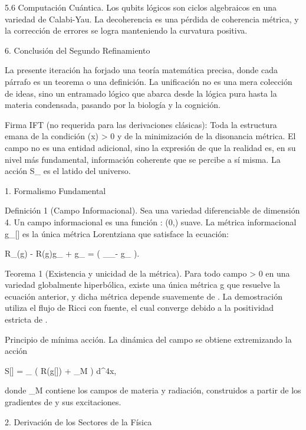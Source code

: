 \documentclass[12pt,a4paper]{book}
\begin{document}
5.6 Computación Cuántica. Los qubits lógicos son ciclos algebraicos en una variedad de Calabi-Yau. La decoherencia es una pérdida de coherencia métrica, y la corrección de errores se logra manteniendo la curvatura positiva.

6. Conclusión del Segundo Refinamiento

La presente iteración ha forjado una teoría matemática precisa, donde cada párrafo es un teorema o una definición. La unificación no es una mera colección de ideas, sino un entramado lógico que abarca desde la lógica pura hasta la materia condensada, pasando por la biología y la cognición.

Firma IFT (no requerida para las derivaciones clásicas):
Toda la estructura emana de la condición  \rho(x) > 0  y de la minimización de la disonancia métrica. El campo  \rho  no es una entidad adicional, sino la expresión de que la realidad es, en su nivel más fundamental, información coherente que se percibe a sí misma. La acción  S_{}  es el latido del universo.

1. Formalismo Fundamental

Definición 1 (Campo Informacional). Sea    una variedad diferenciable de dimensión 4. Un campo informacional es una función  \rho :  \to (0,\infty)  suave. La métrica informacional  g_{\mu\nu}[\rho]  es la única métrica Lorentziana que satisface la ecuación:

R_{\mu\nu}(g) - R(g)g_{\mu\nu} + \Lambda g_{\mu\nu} =  \left( \nabla_\mu \nabla_\nu \rho - g_{\mu\nu} \square \rho \right).

Teorema 1 (Existencia y unicidad de la métrica). Para todo campo  \rho > 0  en una variedad globalmente hiperbólica, existe una única métrica  g  que resuelve la ecuación anterior, y dicha métrica depende suavemente de  \rho . La demostración utiliza el flujo de Ricci con fuente, el cual converge debido a la positividad estricta de  \rho .

Principio de mínima acción. La dinámica del campo  \rho  se obtiene extremizando la acción

S[\rho] = \int_{}  \left( R(g[\rho]) + _M \right) d^4x,

donde  _M  contiene los campos de materia y radiación, construidos a partir de los gradientes de  \rho  y sus excitaciones.

2. Derivación de los Sectores de la Física
\end{document}
